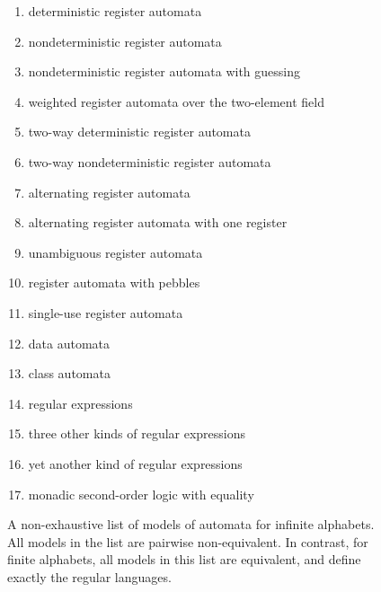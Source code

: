 \begin{figure}
    \begin{enumerate}
    \item deterministic register automata~\cite[Definition 3]{kaminskiFiniteMemoryAutomata1994}
    \item nondeterministic register automata~\cite[Definition 1]{kaminskiFiniteMemoryAutomata1994}
    \item nondeterministic register automata with guessing~\cite[Definition 2.7]{bojanczyk_slightly}
    \item weighted register automata over the two-element field~\cite[Definition 3.1]{orbitFiniteVectorTheoretics}
    \item two-way deterministic register automata~\cite[Definition 5]{kaminskiFiniteMemoryAutomata1994}
    \item two-way nondeterministic register automata~\cite[Definition 2.1]{nevenFiniteStateMachines2004}
    \item alternating register automata~\cite[p.~16:8]{lazicDemri09}
    \item alternating register automata with one register~\cite[p.~16:19]{lazicDemri09}
    \item unambiguous register automata~\cite[Section 5]{colcombet2015unambiguity}
    \item register automata with pebbles~\cite[Section 2.2]{nevenFiniteStateMachines2004}
    \item \label{it:single-use} single-use register automata~\cite[Definition 2]{bojanczykstefanski2020}
    \item data automata~\cite[Section 4.2]{bojanczykTwovariableLogicData2011}
    \item class automata~\cite[Section III]{bojanczykExtensionDataAutomata2010} 
    \item regular expressions~\cite[Definition 2]{regexpKaminskiTan2004}
    \item three other kinds of regular expressions~\cite[Sections 4, 5, 6]{regexpLibkin2015}
    \item yet another kind of regular expressions~\cite[Section 5]{KleeneNominal2019}
    \item monadic second-order logic with equality~\cite[Section 2.4]{nevenFiniteStateMachines2004}
\end{enumerate}
    \caption{A non-exhaustive list of models of automata for infinite alphabets. All models in the list are pairwise non-equivalent. In contrast, for finite alphabets, all models in this list are equivalent, and define exactly the regular languages. }
    \label{fig:automata-infinite-alphabets}
\end{figure}




